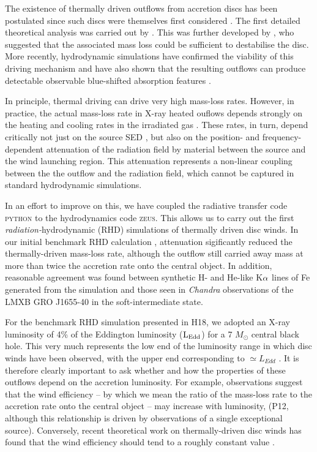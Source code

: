 \documentclass[a4paper,fleqn,usenatbib]{mnras}
\begin{document}
The existence of thermally driven outflows from accretion discs has
been postulated since such discs were themselves 
first considered \citep{1973A&A....24..337S}. The first detailed
theoretical analysis was carried out by
\citet{1983ApJ...271...70B}. This was further developed by
\citet{1986ApJ...306...90S}, who suggested that the associated mass loss
could be sufficient to destabilise the disc. More recently,
hydrodynamic simulations have confirmed the viability of this driving
mechanism and have also shown that the resulting outflows can produce
detectable observable blue-shifted absorption features
\citep{1996ApJ...461..767W,2006ApJ...652L.117N,2010ApJ...719..515L,2015ApJ...807..107H}.  

In principle, thermal driving can drive very high mass-loss
rates. However, in practice, the actual mass-loss rate in X-ray heated
ouflows depends strongly on the heating and cooling rates in the
irradiated gas \citep{2017ApJ...836...42H}. These rates, 
in turn, depend critically not just on the source SED
\citep{2017MNRAS.467.4161D}, but also on the position- and
frequency-dependent attenuation of the
radiation field by material between the source and the wind launching
region. This attenuation represents a non-linear coupling between the
the outflow and the radiation field, which cannot be captured in 
standard hydrodynamic simulations.  

In an effort to improve on this, we have coupled the radiative
transfer code \textsc{python} to the hydrodynamics code
\textsc{zeus}. This allows us to carry out the first {\em
radiation-}hydrodynamic (RHD) simulations of thermally driven disc
winds. In our initial benchmark RHD calculation \citep[hereafter
H18]{2018MNRAS.479.3651H}, attenuation sigificantly reduced the
thermally-driven mass-loss rate, although the outflow still carried
away mass at more than twice the accretion rate onto the central object.
In addition, reasonable agreement was found between synthetic H- and He-like
 K$\rm{\alpha}$ lines of Fe generated from the simulation and those
seen in \emph{Chandra} observations of the LMXB GRO J1655-40 in the
soft-intermediate state. 
 
For the benchmark RHD simulation presented in H18, we adopted an X-ray
luminosity of 4\% of the Eddington luminosity ($\rm{L_{Edd}}$) for a 7 $M_{\odot}$
central black hole. This very much represents the low end of the
luminosity range in which disc winds have been observed, with the
upper end corresponding to $\simeq L_{Edd}$ \citep[][hereafter
P12]{2012MNRAS.422L..11P}. It is therefore clearly important to ask
whether and how the properties of these outflows depend on the
accretion luminosity. For example, observations suggest that the wind efficiency -- by
which we mean the ratio of the mass-loss rate to the accretion rate
onto the central object -- may increase with luminosity,  
(P12, although this relationship is driven by observations of a single
exceptional source). Conversely, recent theoretical work on
thermally-driven disc winds has found that the wind efficiency should
tend to a roughly constant value \citep[][hereafter D18]{2018MNRAS.473..838D}.
\end{document}
